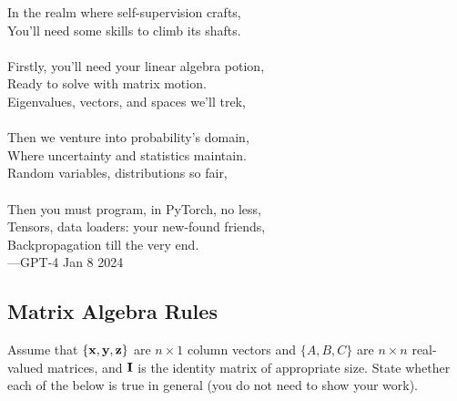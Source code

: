     \begin{table}
    \begin{framed}
    \footnotesize
    In the realm where self-supervision crafts,\\ 
    You'll need some skills to climb its shafts. \\ \\
    Firstly, you'll need your linear algebra potion, \\ 
    Ready to solve with matrix motion. \\ 
    Eigenvalues, vectors, and spaces we'll trek, \\ \\
    Then we venture into probability's domain, \\ 
    Where uncertainty and statistics maintain. \\ 
    Random variables, distributions so fair,  \\ \\
    Then you must program, in PyTorch, no less, \\ 
    Tensors, data loaders: your new-found friends,\\ 
    Backpropagation till the very end.  \\

    \hspace{3.5cm}---GPT-4 Jan 8 2024 
    \end{framed}
    \end{table}
    \subsection{Matrix Algebra Rules}

    Assume that $\left\lbrace \mathbf{x}, \mathbf{y}, \mathbf{z} \right\rbrace$ are $n \times 1$ column vectors and $\{A, B, C\}$ are $n \times n$ real-valued matrices, 
    and $\mathbf{I}$ is the identity matrix of appropriate size. State whether each of the below is true in general (you do not need to show your work).

